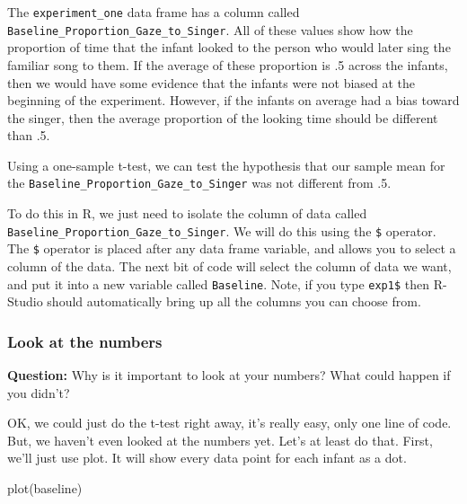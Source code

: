 \documentclass[
]{book}
\newenvironment{Shaded}{\begin{snugshade}}{\end{snugshade}}
\newcommand{\FunctionTok}[1]{\textcolor[rgb]{0.00,0.00,0.00}{#1}}
\newcommand{\NormalTok}[1]{#1}
\newcommand{\OtherTok}[1]{\textcolor[rgb]{0.56,0.35,0.01}{#1}}
\newcommand{\SpecialCharTok}[1]{\textcolor[rgb]{0.00,0.00,0.00}{#1}}
\begin{document}
The \texttt{experiment\_one} data frame has a column called \texttt{Baseline\_Proportion\_Gaze\_to\_Singer}. All of these values show how the proportion of time that the infant looked to the person who would later sing the familiar song to them. If the average of these proportion is .5 across the infants, then we would have some evidence that the infants were not biased at the beginning of the experiment. However, if the infants on average had a bias toward the singer, then the average proportion of the looking time should be different than .5.

Using a one-sample t-test, we can test the hypothesis that our sample mean for the \texttt{Baseline\_Proportion\_Gaze\_to\_Singer} was not different from .5.

To do this in R, we just need to isolate the column of data called \texttt{Baseline\_Proportion\_Gaze\_to\_Singer}. We will do this using the \texttt{\$} operator. The \texttt{\$} operator is placed after any data frame variable, and allows you to select a column of the data. The next bit of code will select the column of data we want, and put it into a new variable called \texttt{Baseline}. Note, if you type \texttt{exp1\$} then R-Studio should automatically bring up all the columns you can choose from.

\begin{Shaded}
\end{Shaded}

\hypertarget{look-at-the-numbers}{%
\subsubsection{Look at the numbers}\label{look-at-the-numbers}}

\textbf{Question:} Why is it important to look at your numbers? What could happen if you didn't?

OK, we could just do the t-test right away, it's really easy, only one line of code. But, we haven't even looked at the numbers yet. Let's at least do that. First, we'll just use plot. It will show every data point for each infant as a dot.

\begin{Shaded}
\begin{Highlighting}[]
\FunctionTok{plot}\NormalTok{(baseline)}
\end{Highlighting}
\end{Shaded}
\end{document}
